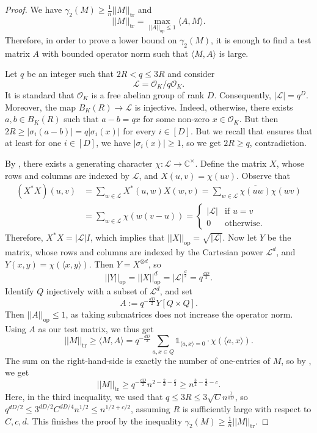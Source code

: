 \documentclass[11pt]{article}
\theoremstyle{plain}
\theoremstyle{definition}
\DeclareMathOperator{\tr}{tr}
\begin{document}
	\begin{proof}
		We have $\gamma_2(M)\geq \frac{1}{n}||M||_{\tr}$ and 
		$$||M||_{\tr}=\max_{||A||_{\text{op}}\leq 1}\langle A,M\rangle.$$
		Therefore, in order to prove a lower bound on $\gamma_2(M)$, it is enough to find a test matrix $A$ with bounded operator norm such that $\langle M,A\rangle$ is large.
		
		Let $q$ be an integer such that $2R<q\leq 3R$ and consider
		$$\mathcal{L}=\mathcal{O}_K/q\mathcal{O}_K.$$
		It is standard that $\mathcal O_K$ is a free abelian group of rank
		$D$. Consequently, $|\mathcal{L}|=q^D$. Moreover, the map $B_K(R)\rightarrow \mathcal{L}$ is injective. Indeed, otherwise, there exists $a,b\in B_K(R)$ such that $a-b=qx$ for some non-zero $x\in \mathcal{O}_K$. But then $2R\geq |\sigma_i(a-b)|=q|\sigma_i(x)|$ for every $i\in [D]$. But we recall that  ensures that at least for one $i\in [D]$, we have $|\sigma_i(x)|\geq 1$, so we get $2R\geq q$, contradiction.
		
		By , there exists a generating character $\chi:\mathcal{L}\rightarrow \mathbb{C}^{\times}$. Define the matrix $X$, whose rows and columns are indexed by $\mathcal{L}$, and $X(u,v)=\chi(uv)$.
		Observe that
		\begin{align*}
			(X^*X)(u,v)&=\sum_{w\in \mathcal{L}} X^*(u,w)X(w,v)=\sum_{w\in \mathcal{L}}\overline{\chi(uw)}\chi(wv)\\
			&=\sum_{w\in \mathcal{L}}\chi(w(v-u))=\begin{cases}|\mathcal{L}|&\text{if }u=v\\ 0&\text{otherwise.}\end{cases}
		\end{align*}
		Therefore, $X^*X=|\mathcal{L}| I$, which implies that $||X||_{\text{op}}=\sqrt{|\mathcal{L}|}$. Now let $Y$ be the matrix, whose rows and columns are indexed by the Cartesian power $\mathcal{L}^d$, and $Y(x,y)=\chi(\langle x,y\rangle)$. Then $Y=X^{\otimes d}$, so $$||Y||_{\text{op}}=||X||_{\text{op}}^{d}=|\mathcal{L}|^{\frac{d}{2}}=q^{\frac{dD}{2}}.$$
		Identify $Q$ injectively  with a subset of $\mathcal{L}^d$, and set
		$$A:=q^{-\frac{dD}{2}} Y\left[ Q\times Q\right].$$
		Then  $||A||_{\text{op}}\leq 1$, as taking submatrices does not increase the operator norm. Using $A$ as our test matrix, we thus get
		$$||M||_{\tr}\geq \langle M,A\rangle=q^{-\frac{dD}{2}}\sum_{a,x\in Q} \mathds{1}_{\langle a,x\rangle=0}\cdot \chi(\langle a,x\rangle).$$
		The sum on the right-hand-side is exactly the number of one-entries of $M$, so by , we get
		$$||M||_{\tr}\geq q^{-\frac{dD}{2}}n^{2-\frac{2}{d}-\frac{c}{2}}\geq n^{\frac{3}{2}-\frac{2}{d}-c}.$$
		Here, in the third inequality, we used that $q\leq 3R\leq 3\sqrt{C}n^{\frac{1}{dD}}$, so $q^{dD/2}\leq 3^{dD/2}C^{dD/4}n^{1/2}\leq n^{1/2+c/2}$, assuming $R$ is sufficiently large with respect to $C,c,d$. This finishes the proof by the inequality $\gamma_2(M)\geq\frac{1}{n}||M||_{\tr}$.
	\end{proof}
	
\end{document}
